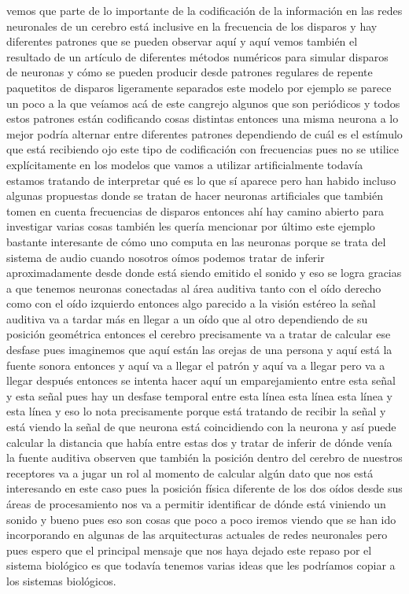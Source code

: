 vemos que parte de lo importante de la codificación de la información en las redes neuronales de un cerebro está inclusive en la frecuencia de los disparos y hay diferentes patrones que se pueden observar aquí y aquí vemos también el resultado de un artículo de diferentes métodos numéricos para simular disparos de neuronas y cómo se pueden producir desde patrones regulares de repente paquetitos de disparos ligeramente separados este modelo por ejemplo se parece un poco a la que veíamos acá de este cangrejo algunos que son periódicos y todos estos patrones están codificando cosas distintas entonces una misma neurona a lo mejor podría alternar entre diferentes patrones dependiendo de cuál es el estímulo que está recibiendo ojo este tipo de codificación con frecuencias pues no se utilice explícitamente en los modelos que vamos a utilizar artificialmente todavía estamos tratando de interpretar qué es lo que sí aparece pero han habido incluso algunas propuestas donde se tratan de hacer neuronas artificiales que también tomen en cuenta frecuencias de disparos entonces ahí hay camino abierto para investigar varias cosas también les quería mencionar por último este ejemplo bastante interesante de cómo uno computa en las neuronas porque se trata del sistema de audio cuando nosotros oímos podemos tratar de inferir aproximadamente desde donde está siendo emitido el sonido y eso se logra gracias a que tenemos neuronas conectadas al área auditiva tanto con el oído derecho como con el oído izquierdo entonces algo parecido a la visión estéreo la señal auditiva va a tardar más en llegar a un oído que al otro dependiendo de su posición geométrica entonces el cerebro precisamente va a tratar de calcular ese desfase pues imaginemos que aquí están las orejas de una persona y aquí está la fuente sonora entonces y aquí va a llegar el patrón y aquí va a llegar pero va a llegar después entonces se intenta hacer aquí un emparejamiento entre esta señal y esta señal pues hay un desfase temporal entre esta línea esta línea esta línea y esta línea y eso lo nota precisamente porque está tratando de recibir la señal y está viendo la señal de que neurona está coincidiendo con la neurona y así puede calcular la distancia que había entre estas dos y tratar de inferir de dónde venía la fuente auditiva observen que también la posición dentro del cerebro de nuestros receptores va a jugar un rol al momento de calcular algún dato que nos está interesando en este caso pues la posición física diferente de los dos oídos desde sus áreas de procesamiento nos va a permitir identificar de dónde está viniendo un sonido y bueno pues eso son cosas que poco a poco iremos viendo que se han ido incorporando en algunas de las arquitecturas actuales de redes neuronales pero pues espero que el principal mensaje que nos haya dejado este repaso por el sistema biológico es que todavía tenemos varias ideas que les podríamos copiar a los sistemas biológicos.

